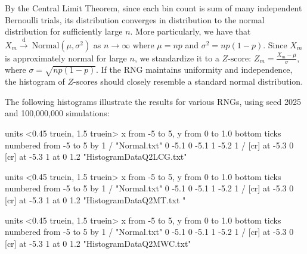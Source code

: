 \documentclass{article}
\begin{document}
By the Central Limit Theorem, since each bin count is sum of many independent Bernoulli trials, its distribution converges in distribution to the normal distribution for sufficiently large \(n\). More particularly, we have that \(X_m \xrightarrow{\text{d}}\ \text{Normal}\left(\mu, \sigma^2\right)\) as \(n \rightarrow \infty \) where \(\mu = np\) and \(\sigma^2 = np(1-p)\). Since \(X_m\) is approximately normal for large \(n\), we standardize it to a \(Z\text{-score}\): \(Z_m = \frac{X_m - \mu}{\sigma}\), where \(\sigma = \sqrt{np(1 - p)}\).  If the RNG maintains uniformity and independence, the histogram of \(Z\text{-scores}\) should closely resemble a standard normal distribution. 

The following histograms illustrate the results for various RNGs, using seed 2025 and 100,000,000 simulations:

\begin{center}
\maketitle
\beginpicture
\setcoordinatesystem units <0.45 truein, 1.5 truein>
\setplotarea x from -5 to 5, y from  0 to 1.0
\axis bottom
ticks numbered from -5 to 5 by 1
/
\plot "Normal.txt"
 0 -5.1 0 -5.1 1  -5.2 1 /
 [cr] at -5.3 0
 [cr] at -5.3 1
 at 0 1.2
\sethistograms
\plot "HistogramDataQ2LCG.txt"
\endpicture
\end{center}

\begin{center}
\maketitle
\beginpicture
\setcoordinatesystem units <0.45 truein, 1.5 truein>
\setplotarea x from -5 to 5, y from  0 to 1.0
\axis bottom
ticks numbered from -5 to 5 by 1
/
\plot "Normal.txt"
 0 -5.1 0 -5.1 1  -5.2 1 /
 [cr] at -5.3 0
 [cr] at -5.3 1
 at 0 1.2
\sethistograms
\plot "HistogramDataQ2MT.txt
"
\endpicture
\end{center}

\begin{center}
\maketitle
\beginpicture
\setcoordinatesystem units <0.45 truein, 1.5 truein>
\setplotarea x from -5 to 5, y from  0 to 1.0
\axis bottom
ticks numbered from -5 to 5 by 1
/
\plot "Normal.txt"
 0 -5.1 0 -5.1 1  -5.2 1 /
 [cr] at -5.3 0
 [cr] at -5.3 1
 at 0 1.2
\sethistograms
\plot "HistogramDataQ2MWC.txt"
\endpicture
\end{center}
\end{document}

